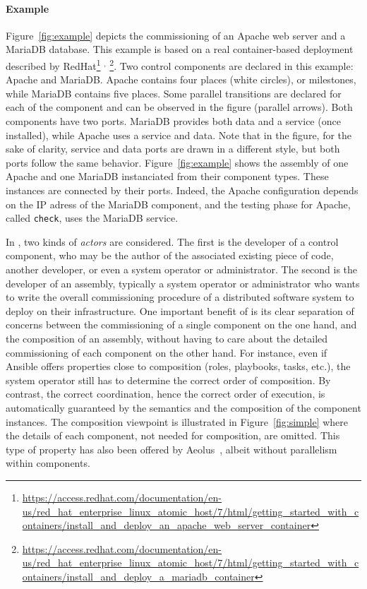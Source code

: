\paragraph{Example}{ Figure~\ref{fig:example} depicts the \mad
  commissioning of an Apache web server and a MariaDB database. This
  example is based on a real container-based deployment described by
  RedHat\footnote{\url{https://access.redhat.com/documentation/en-us/red_hat_enterprise_linux_atomic_host/7/html/getting_started_with_containers/install_and_deploy_an_apache_web_server_container}}%
  $^,$%
  \footnote{\url{https://access.redhat.com/documentation/en-us/red_hat_enterprise_linux_atomic_host/7/html/getting_started_with_containers/install_and_deploy_a_mariadb_container}}. Two
  \mad control components are declared in this example: Apache and
  MariaDB. Apache contains four places (white circles), or milestones,
  while MariaDB contains five places. Some parallel transitions are
  declared for each of the component and can be observed in the figure
  (parallel arrows). Both components have two ports. MariaDB provides
  both data and a service (once installed), while Apache uses a
  service and data. Note that in the figure, for the sake of clarity,
  service and data ports are drawn in a different style, but both
  ports follow the same behavior. Figure~\ref{fig:example} shows the
  assembly of one Apache and one MariaDB instanciated from their
  component types. These instances are connected by their
  ports. Indeed, the Apache configuration depends on the IP adress of
  the MariaDB component, and the testing phase for Apache, called
  \texttt{check}, uses the MariaDB service.}

In \mad, two kinds of \emph{actors} are considered. The first is the
developer of a control component, who may be the author of the
associated existing piece of code, another developer, or even a system
operator or administrator. The second is the developer of an assembly,
typically a system operator or administrator who wants to write the
overall commissioning procedure of a distributed software system to
deploy on their infrastructure. One important benefit of \mad is its
clear separation of concerns between the commissioning of a single
component on the one hand, and the composition of an assembly, without
having to care about the detailed commissioning of each component on
the other hand. For instance, even if Ansible offers properties close
to composition (\eg roles, playbooks, tasks, etc.), the system
operator still has to determine the correct order of composition. By
contrast, the correct coordination, hence the correct order of
execution, is automatically guaranteed by the \mad semantics and the
composition of the component instances. The composition viewpoint is
illustrated in Figure~\ref{fig:simple} where the details of each
component, not needed for composition, are omitted. This type of
property has also been offered by Aeolus~\cite{dicosmo2014ic}, albeit
without parallelism within components.

